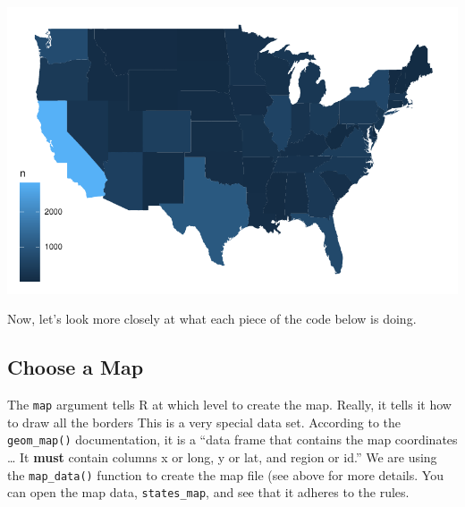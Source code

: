 \documentclass[
  letterpaper,
  DIV=11,
  numbers=noendperiod]{scrreprt}
\newenvironment{Shaded}{\begin{snugshade}}{\end{snugshade}}
\newcommand{\AttributeTok}[1]{\textcolor[rgb]{0.40,0.45,0.13}{#1}}
\newcommand{\FunctionTok}[1]{\textcolor[rgb]{0.28,0.35,0.67}{#1}}
\newcommand{\NormalTok}[1]{\textcolor[rgb]{0.00,0.23,0.31}{#1}}
\newcommand{\SpecialCharTok}[1]{\textcolor[rgb]{0.37,0.37,0.37}{#1}}
\begin{document}
\includegraphics{src/06-Spatial_Viz_files/figure-pdf/unnamed-chunk-12-1.pdf}

Now, let's look more closely at what each piece of the code below is
doing.

\begin{Shaded}
\end{Shaded}

\subsection*{Choose a Map}\label{choose-a-map}

The \texttt{map} argument tells R at which level to create the map.
Really, it tells it how to draw all the borders This is a very special
data set. According to the \texttt{geom\_map()} documentation, it is a
``data frame that contains the map coordinates \ldots{} It \textbf{must}
contain columns x or long, y or lat, and region or id.'' We are using
the \texttt{map\_data()} function to create the map file (see above for
more details. You can open the map data, \texttt{states\_map}, and see
that it adheres to the rules.
\end{document}
